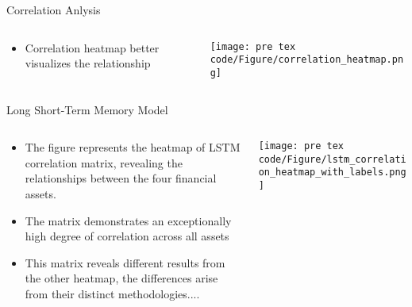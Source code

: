   \begin{frame}{Correlation Anlysis}
        \begin{columns}
        \begin{column}{0.5\textwidth}
        \begin{itemize}
            
            \item<1-> Correlation heatmap better visualizes the relationship
        \end{itemize}
        \end{column}
        \begin{column}{0.6\textwidth}  %
            \begin{center}
             \texttt{[image: pre tex code/Figure/correlation\_heatmap.png]}
             \end{center}
        \end{column}
        \end{columns}
    \end{frame}

    \begin{frame}{Long Short-Term Memory Model}
        \begin{columns}
        \begin{column}{0.5\textwidth}
        \begin{itemize}
            \item<1-> The figure represents the heatmap of LSTM correlation matrix, revealing the relationships between the four financial assets.
            \item<2-> The matrix demonstrates an exceptionally high degree of correlation across all assets
            \item<3-> This matrix reveals different results from the other heatmap, the differences arise from their distinct methodologies....
        \end{itemize}
        \end{column}
        \begin{column}{0.5\textwidth}  %
            \begin{center}
             \texttt{[image: pre tex code/Figure/lstm\_correlation\_heatmap\_with\_labels.png]}
             \end{center}
        \end{column}
        \end{columns}
    \end{frame}


  
    
    